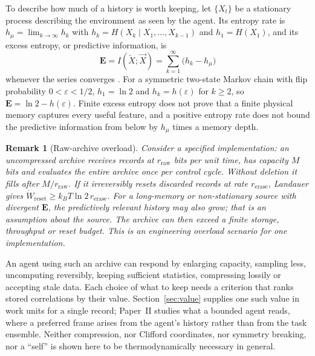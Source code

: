 \documentclass[12pt]{article}
\newtheorem{remark}[theorem]{Remark}
\begin{document}
To describe how much of a history is worth keeping, let $\{X_t\}$ be a stationary process describing the environment as seen by the agent. Its entropy rate is $h_\mu=\lim_{k\to\infty}h_k$ with $h_k=H(X_k\mid X_1,\dots,X_{k-1})$ and $h_1=H(X_1)$, and its excess entropy, or predictive information, is
\begin{equation}
\label{eq:pred_info}
\mathbf E=I(\overleftarrow X;\overrightarrow X)=\sum_{k=1}^\infty\bigl(h_k-h_\mu\bigr)
\end{equation}
whenever the series converges \cite{CrutchfieldFeldman2003,BialekNemenmanTishby2001,ShaliziCrutchfield2001}. For a symmetric two-state Markov chain with flip probability $0<\varepsilon<1/2$, $h_1=\ln2$ and $h_k=h(\varepsilon)$ for $k\ge2$, so $\mathbf E=\ln2-h(\varepsilon)$. Finite excess entropy does not prove that a finite physical memory captures every useful feature, and a positive entropy rate does not bound the predictive information from below by $h_\mu$ times a memory depth.

\begin{remark}[Raw-archive overload]
\label{rem:archive_overload}
Consider a specified implementation: an uncompressed archive receives records at $r_{\mathrm{raw}}$ bits per unit time, has capacity $M$ bits and evaluates the entire archive once per control cycle. Without deletion it fills after $M/r_{\mathrm{raw}}$. If it irreversibly resets discarded records at rate $r_{\mathrm{erase}}$, Landauer gives $\dot W_{\mathrm{reset}}\ge k_BT\ln2\,r_{\mathrm{erase}}$. For a long-memory or non-stationary source with divergent $\mathbf E$, the predictively relevant history may also grow; that is an assumption about the source. The archive can then exceed a finite storage, throughput or reset budget. This is an engineering overload scenario for one implementation.
\end{remark}

An agent using such an archive can respond by enlarging capacity, sampling less, uncomputing reversibly, keeping sufficient statistics, compressing lossily or accepting stale data. Each choice of what to keep needs a criterion that ranks stored correlations by their value. Section~\ref{sec:value} supplies one such value in work units for a single record; Paper~II studies what a bounded agent reads, where a preferred frame arises from the agent's history rather than from the task ensemble. Neither compression, nor Clifford coordinates, nor symmetry breaking, nor a ``self'' is shown here to be thermodynamically necessary in general.
\end{document}
